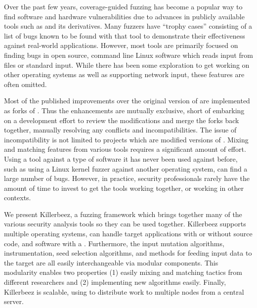 Over the past few years, coverage-guided fuzzing has become a popular way to
find software and hardware vulnerabilities due to advances in publicly
available tools such as \AFL{}\cite{afl} and its derivatives.\cite{vanhauser} Many
fuzzers have ``trophy cases'' consisting of a list of bugs known to be found with that tool to
demonstrate their effectiveness against real-world applications.\cite{rustfuzztrophy}\cite{honggfuzz}\cite{afl}  However, most
tools are primarily focused on finding bugs in open source, command line Linux
software which reads input from files or standard input. While there has been some
exploration to get \AFL{} working on other operating
systems\cite{aflosx,winafl} as well as supporting network
input,\cite{netafl,preeny} these features are often omitted.

Most of the published improvements over the original version of \AFL{} are
implemented as forks of
\AFL{}.\cite{aflfast,aflgo,fairfuzz,perffuzz,pythia,collafl}
Thus the enhancements are mutually exclusive, short of embarking on a
development effort to review the modifications and merge the forks back
together, manually resolving any conflicts and incompatibilities.  The issue
of incompatibility is not limited to projects which are modified versions of
\AFL{}. Mixing and matching features from various tools requires a significant
amount of effort. Using a tool against a type of software it has never been
used against before, such as using a Linux kernel fuzzer against another
operating system, can find a large number of bugs\cite{anton}.  However, in practice, security
professionals rarely have the amount of time to invest to get the tools working
together, or working in other contexts.

We present Killerbeez, a fuzzing framework which brings together many of the
various security analysis tools so they can be used together.  Killerbeez
supports multiple operating systems, can handle target applications with or
without source code, and software with a \GUI{}.
Furthermore, the input mutation algorithms, instrumentation, seed selection
algorithms, and methods for feeding input data to the target are all easily
interchangeable via modular components.  This modularity enables two
properties (1) easily mixing and matching
tactics from different researchers and (2) implementing new algorithms easily.
Finally, Killerbeez is scalable, using \BOINC{}\cite{boinc} to distribute work
to multiple nodes from a central server.

